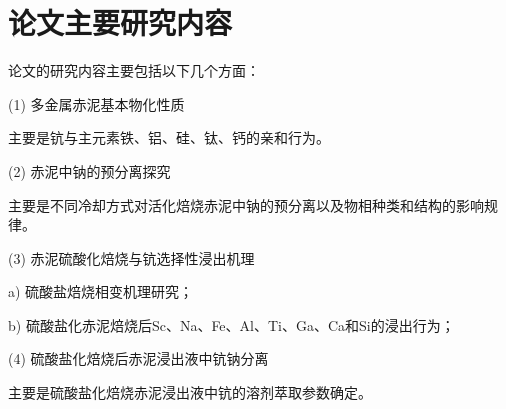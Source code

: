\section{论文主要研究内容}

论文的研究内容主要包括以下几个方面：

(1) 多金属赤泥基本物化性质

主要是钪与主元素铁、铝、硅、钛、钙的亲和行为。

(2) 赤泥中钠的预分离探究

主要是不同冷却方式对活化焙烧赤泥中钠的预分离以及物相种类和结构的影响规律。

(3) 赤泥硫酸化焙烧与钪选择性浸出机理

a) 硫酸盐焙烧相变机理研究；

b) 硫酸盐化赤泥焙烧后Sc、Na、Fe、Al、Ti、Ga、Ca和Si的浸出行为；

(4) 硫酸盐化焙烧后赤泥浸出液中钪钠分离

主要是硫酸盐化焙烧赤泥浸出液中钪的溶剂萃取参数确定。


